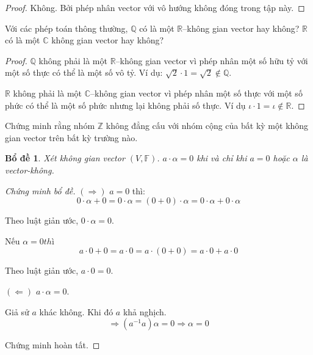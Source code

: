 \documentclass[class=linearalgebra,crop=false]{standalone}
\newtheorem{lemma}{Bổ đề}
\begin{document}
\begin{proof}Không. Bởi phép nhân vector với vô hướng không đóng trong tập này.
\end{proof}

\begin{exercise}Với các phép toán thông thường, $\mathbb{Q}$ có là một $\mathbb{R}$--không gian vector hay không? $\mathbb{R}$ có là một $\mathbb{C}$ không gian vector hay không?
\end{exercise}

\begin{proof}$\mathbb{Q}$ không phải là một $\mathbb{R}$--không gian vector vì phép nhân một số hữu tỷ với một số thực có thể là một số vô tỷ. Ví dụ: $\sqrt{2}\cdot 1 = \sqrt{2}\not\in\mathbb{Q}$.
    \par $\mathbb{R}$ không phải là một $\mathbb{C}$--không gian vector vì phép nhân một số thực với một số phức có thể là một số phức nhưng lại không phải số thực. Ví dụ $\iota\cdot 1 = \iota\not\in\mathbb{R}$.
\end{proof}

\begin{exercise}Chứng minh rằng nhóm $\mathbb{Z}$ không đẳng cấu với nhóm cộng của bất kỳ một không gian vector trên bất kỳ trường nào.
\end{exercise}

\begin{lemma}Xét không gian vector $(V, \mathbb{F})$. $a\cdot\alpha = 0$ khi và chỉ khi $a = 0$ hoặc $\alpha$ là vector-không.
\end{lemma}

\begin{proof}[Chứng minh bổ đề]$(\Rightarrow)$ $a = 0$ thì:
    \[ 0\cdot\alpha + 0 = 0\cdot\alpha = (0 + 0)\cdot\alpha = 0\cdot\alpha + 0\cdot\alpha \]
    \par Theo luật giản ước, $0\cdot\alpha = 0$.
    \par Nếu $\alpha = 0 thì$
    \[ a\cdot 0 + 0 = a\cdot 0 = a\cdot (0 + 0) = a\cdot 0 + a\cdot 0 \]
    \par Theo luật giản ước, $a\cdot 0 = 0$.
    \bigskip
    \par $(\Leftarrow)$ $a\cdot\alpha = 0$.
    \par Giả sử $a$ khác không. Khi đó $a$ khả nghịch.
    \[ \Rightarrow (a^{-1}a)\alpha = 0 \Rightarrow \alpha = 0\]
    \par Chứng minh hoàn tất.
\end{proof}
\end{document}
